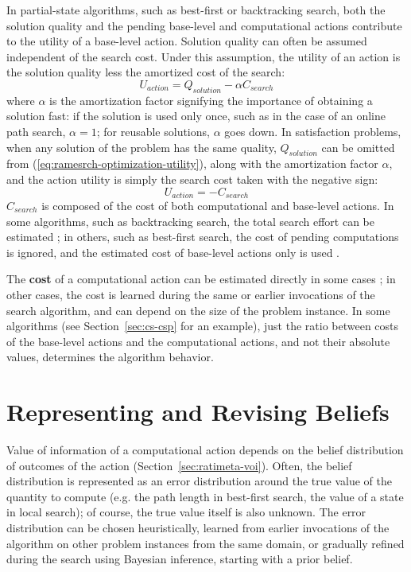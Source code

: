 In partial-state algorithms, such as best-first or backtracking
search, both the solution quality and the pending base-level and
computational actions contribute to the utility of a base-level
action. Solution quality can often be assumed independent of the
search cost. Under this assumption, the utility of an action is the solution quality
less the amortized cost of the search:
\begin{equation}
\label{eq:ramesrch-optimization-utility}
U_{action}=Q_{solution}-\alpha C_{search}
\end{equation} where $\alpha$ is the amortization factor signifying the
importance of obtaining a solution fast: if the solution is used only
once, such as in the case of an online path search, $\alpha=1$; for
reusable solutions, $\alpha$ goes down. In satisfaction problems, when
any solution of the problem has the same quality, $Q_{solution}$
can be omitted from (\ref{eq:ramesrch-optimization-utility}), along
with the amortization factor $\alpha$, and the action utility is
simply the search cost taken with the negative sign:
\begin{equation}
\label{eq:ramesrch-satisfaction-utility} U_{action}=-C_{search}
\end{equation} $C_{search}$ is composed of the cost of both
computational and base-level actions. In some algorithms, such as
backtracking search, the total search effort can be estimated
\cite{Knuth.backtrack}\cite{Refalo.impact}; in others, such as
best-first search, the cost of pending computations is ignored, and
the estimated cost of base-level actions only is used
\cite{Russell.right}.

The {\bf cost} of a computational action can be estimated directly in
some cases \cite{Russell.right}; in other cases, the cost is learned
during the same or earlier invocations of the search algorithm, and
can depend on the size of the problem instance. In some algorithms
(see Section~\ref{sec:cs-csp} for an example), just the ratio between
costs of the base-level actions and the computational actions, and not
their absolute values, determines the algorithm behavior.

\section{Representing and Revising Beliefs}

Value of information of a computational action depends on the belief
distribution of outcomes of the action
(Section~\ref{sec:ratimeta-voi}).  Often, the belief distribution is
represented as an error distribution around the true value of the
quantity to compute (e.g. the path length in best-first search, the
value of a state in local search); of course, the true value itself is
also unknown.  The error distribution can be chosen heuristically,
learned from earlier invocations of the algorithm on other problem
instances from the same domain, or gradually refined during the search
using Bayesian inference, starting with a prior belief.

